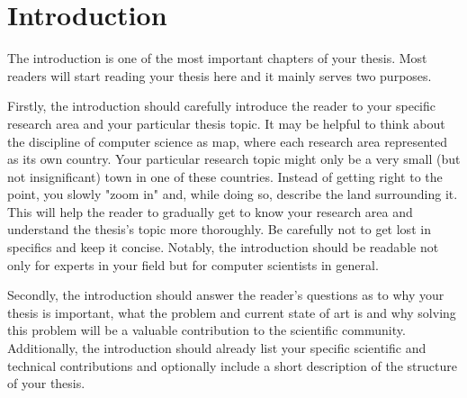 \chapter{Introduction}\label{ch:introduction}
The introduction is one of the most important chapters of your thesis.
Most readers will start reading your thesis here and it mainly serves two purposes.

Firstly, the introduction should carefully introduce the reader to your specific research area and your particular thesis topic.
It may be helpful to think about the discipline of computer science as map, where each research area represented as its own country.
Your particular research topic might only be a very small (but not insignificant) town in one of these countries.
Instead of getting right to the point, you slowly "zoom in" and, while doing so, describe the land surrounding it.
This will help the reader to gradually get to know your research area and understand the thesis's topic more thoroughly.
Be carefully not to get lost in specifics and keep it concise.
Notably, the introduction should be readable not only for experts in your field but for computer scientists in general.

Secondly, the introduction should answer the reader's questions as to why your thesis is important, what the problem and current state of art is and why solving this problem will be a valuable contribution to the scientific community.
Additionally, the introduction should already list your specific scientific and technical contributions and optionally include a short description of the structure of your thesis.
